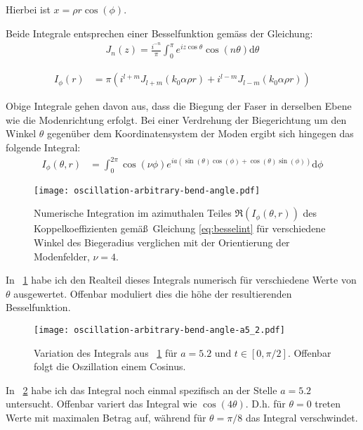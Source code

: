 \documentclass[DIV19,twocolumn]{scrartcl}
\def\({\left(}
\def\){\right)}
\newcommand{\figref}[1]{\figurename~\ref{#1}}
\begin{document}
Hierbei ist $x=\rho r \cos(\phi)$.

Beide Integrale entsprechen einer Besselfunktion gem\"ass der
Gleichung:
\begin{align}
  J_n(z) = \frac{i^{-n}}{\pi}\int_0^\pi e^{iz\cos\theta} \cos(n \theta) \textrm{d} \theta
\end{align}

\begin{align}
  I_\phi(r) &= \pi \(i^{l+m} J_{l+m}(k_0\alpha\rho r)+i^{l-m} J_{l-m}(k_0\alpha\rho r)\)
\end{align}

Obige Integrale gehen davon aus, dass die Biegung der Faser in
derselben Ebene wie die Modenrichtung erfolgt. Bei einer Verdrehung
der Biegerichtung um den Winkel $\theta$ gegen\"uber dem
Koordinatensystem der Moden ergibt sich hingegen das folgende
Integral:
\begin{align}
  \label{eq:besselint}
  I_\phi(\theta,r) &= \int_0^{2\pi}\cos(\nu\phi) e^{ia(\sin(\theta)\cos(\phi)+\cos(\theta)\sin(\phi))} \textrm{d}\phi 
\end{align}


\begin{figure}[!hbt]
  \centering
  \texttt{[image: oscillation-arbitrary-bend-angle.pdf]}
  \caption{Numerische Integration im azimuthalen Teiles $\Re\(I_\phi(\theta,r)\)$ des
    Koppelkoeffizienten gem\"a\ss\ Gleichung \eqref{eq:besselint}
    f\"ur verschiedene Winkel des Biegeradius verglichen mit der
    Orientierung der Modenfelder, $\nu=4$.}
  \label{fig:besselint}
\end{figure}

In \figref{fig:besselint} habe ich den Realteil dieses Integrals
numerisch f\"ur verschiedene Werte von $\theta$ ausgewertet. Offenbar
moduliert dies die h\"ohe der resultierenden Besselfunktion.

\begin{figure}[!hbt]
  \centering
  \texttt{[image: oscillation-arbitrary-bend-angle-a5\_2.pdf]}
  \caption{Variation des Integrals aus \figref{fig:besselint} f\"ur
    $a=5.2$ und $t\in[0,\pi/2]$. Offenbar folgt die Oszillation
    einem Cosinus.}
  \label{fig:besselint2}
\end{figure}

In \figref{fig:besselint2} habe ich das Integral noch einmal
spezifisch an der Stelle $a=5.2$ untersucht. Offenbar variert das
Integral wie $\cos(4\theta)$. D.h. f\"ur $\theta=0$ treten Werte mit
maximalen Betrag auf, w\"ahrend f\"ur $\theta=\pi/8$ das Integral
verschwindet.
\end{document}
